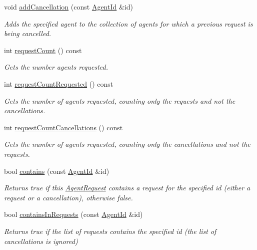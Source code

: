 \begin{DoxyCompactItemize}
void \hyperlink{classrepast_1_1_agent_request_a55316e3d48f9be97552701efd9b0bfea}{add\-Cancellation} (const \hyperlink{classrepast_1_1_agent_id}{Agent\-Id} \&id)
\begin{DoxyCompactList}\small\item\em Adds the specified agent to the collection of agents for which a previous request is being cancelled. \end{DoxyCompactList}\item 
int \hyperlink{classrepast_1_1_agent_request_ab3b18ef9714e7c9cccddda1c91de64ac}{request\-Count} () const 
\begin{DoxyCompactList}\small\item\em Gets the number agents requested. \end{DoxyCompactList}\item 
int \hyperlink{classrepast_1_1_agent_request_a3cc36891325c34f23a074a816618fe81}{request\-Count\-Requested} () const 
\begin{DoxyCompactList}\small\item\em Gets the number of agents requested, counting only the requests and not the cancellations. \end{DoxyCompactList}\item 
int \hyperlink{classrepast_1_1_agent_request_a3e842fbe34e47433f51066eed03983b4}{request\-Count\-Cancellations} () const 
\begin{DoxyCompactList}\small\item\em Gets the number of agents requested, counting only the cancellations and not the requests. \end{DoxyCompactList}\item 
bool \hyperlink{classrepast_1_1_agent_request_aa2389d645973a361b97f4e7f5e1a0b86}{contains} (const \hyperlink{classrepast_1_1_agent_id}{Agent\-Id} \&id)
\begin{DoxyCompactList}\small\item\em Returns true if this \hyperlink{classrepast_1_1_agent_request}{Agent\-Request} contains a request for the specified id (either a request or a cancellation), otherwise false. \end{DoxyCompactList}\item 
bool \hyperlink{classrepast_1_1_agent_request_a31aac02439a7b368e92c65acc11f3bb7}{contains\-In\-Requests} (const \hyperlink{classrepast_1_1_agent_id}{Agent\-Id} \&id)
\begin{DoxyCompactList}\small\item\em Returns true if the list of requests contains the specified id (the list of cancellations is ignored) \end{DoxyCompactList}\item 

\end{DoxyCompactItemize}
